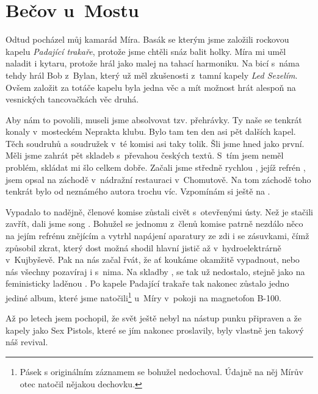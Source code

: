
\chapter{Bečov u~Mostu}

Odtud pocházel můj kamarád Míra. Basák se kterým jsme založili rockovou kapelu
{\em Padající trakaře}, protože jsme chtěli snáz balit holky. Míra mi uměl
naladit i kytaru, protože hrál jako malej na tahací harmoniku. Na bicí s~náma
tehdy hrál Bob z~Bylan, který už měl zkušenosti z~tamní kapely {\em Led
Sezelím}. Ovšem založit za totáče kapelu byla jedna věc a mít možnost hrát
alespoň na vesnických tancovačkách věc druhá.

Aby nám to povolili, museli jsme absolvovat tzv. přehrávky. Ty naše se tenkrát
konaly v~mosteckém Neprakta klubu. Bylo tam ten den asi pět dalších kapel. Těch
soudruhů a soudružek v~té komisi asi taky tolik. Šli jsme hned jako první. Měli
jsme zahrát pět skladeb s~převahou českých textů. S~tím jsem neměl problém,
skládat mi šlo celkem dobře. Začali jsme středně rychlou , jejíž refrén , jsem opsal na
záchodě v~nádražní restauraci v~Chomutově. Na tom záchodě toho tenkrát bylo od
neznámého autora trochu víc. Vzpomínám si ještě na .

Vypadalo to nadějně, členové komise zůstali civět s~otevřenými ústy. Než je
stačili zavřít, dali jsme song . Bohužel se jednomu
z~členů komise patrně nezdálo něco na jejím refrénu znějícím  a vytrhl napájení aparatury ze zdi i se zásuvkami,
čímž způsobil zkrat, který dost možná shodil hlavní jistič až v~hydroelektrárně
v~Kujbyševě. Pak na nás začal řvát, že ať koukáme okamžitě vypadnout, nebo nás
všechny pozavíraj i s~nima. Na skladby ,  se tak už nedostalo,
stejně jako na feministicky laděnou .
Po kapele Padající trakaře tak nakonec zůstalo jedno jediné album, které jsme
natočili\footnote{Pásek s originálním záznamem se bohužel nedochoval. Údajně na
něj Mírův otec natočil nějakou dechovku.} u~Míry v~pokoji na magnetofon B-100.

Až po letech jsem pochopil, že svět ještě nebyl na nástup punku připraven a že
kapely jako Sex Pistols, které se jím nakonec proslavily, byly vlastně jen
takový náš revival.
